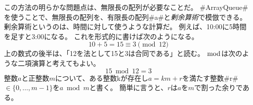 この方法の明らかな問題点は、無限長の配列が必要なことだ。
#ArrayQueue#を使うことで、無限長の配列を、有限長の配列#a#と\emph{剰余算術}で模倣できる。
%
剰余算術というのは、時間に対して使うような計算だ。
例えば、10:00に5時間を足すと3:00になる。
これを形式的に書けば次のようになる。
\[
    10 + 5 = 15 \equiv 3 \pmod{12}
\]
上の数式の後半は、「12を法として15と3は合同である」と読む。
$\bmod$は次のような二項演算と考えてもよい。
\[
   15 \bmod 12 = 3
\]
整数$a$と正整数$m$について、ある整数kが存在し$a = km + r$を満たす整数#r# $\in \{0, \ldots, m-1 \}$を$a \bmod m $と書く。
簡単に言うと、$r$は$a$を$m$で割った余りである。
